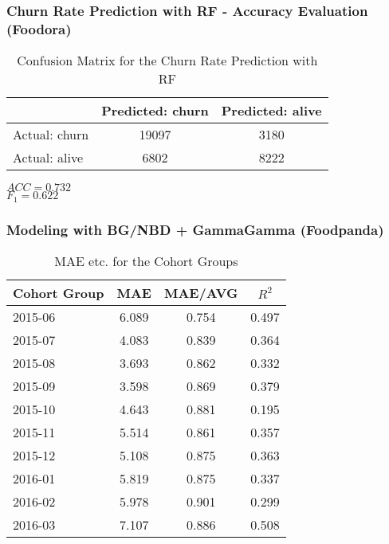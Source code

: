 \documentclass{beamer} %
\theoremstyle{definition} %
\begin{document}
\begin{frame}
\frametitle{Churn Rate Prediction with RF - Accuracy Evaluation (Foodora)}
\begin{center}
            \begin{table}
\begin{tabular}{l | c | c }
 & Predicted: churn & Predicted: alive\\
\hline \hline
Actual: churn & 19097 & 3180\\ 
Actual: alive & 6802 & 8222
\end{tabular}
\caption{Confusion Matrix for the Churn Rate Prediction with RF}
\end{table}
        \end{center}      
       
\begin{rmk}
	$ACC=0.732$ \\    
    $F_1=0.622$
\end{rmk}
\end{frame}

\begin{frame}
\frametitle{Modeling with BG/NBD + GammaGamma (Foodpanda)}
\begin{center}
            \begin{table}
\begin{tabular}{l | c | c | c }
Cohort Group & MAE & MAE/AVG & $R^2$ \\
\hline \hline
2015-06 & 6.089 & 0.754 & 0.497\\ 
2015-07 & 4.083 & 0.839 & 0.364\\
2015-08 & 3.693 & 0.862 & 0.332\\
2015-09 & 3.598 & 0.869 & 0.379\\ 
2015-10 & 4.643 & 0.881 & 0.195\\ 
2015-11 & 5.514 & 0.861 & 0.357\\
2015-12 & 5.108 & 0.875 & 0.363\\
2016-01 & 5.819 & 0.875 & 0.337\\ 
2016-02 & 5.978 & 0.901 & 0.299\\ 
2016-03 & 7.107 & 0.886 & 0.508\\ 
\end{tabular}
\caption{MAE etc. for the Cohort Groups}
\end{table}
        \end{center}
\end{frame}
\end{document}
